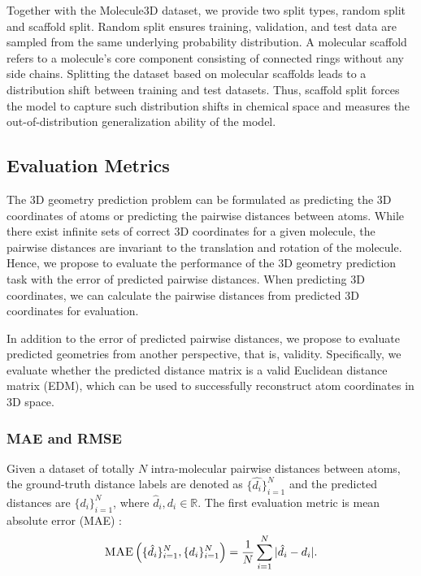 \documentclass{article}
\begin{document}
Together with the Molecule3D dataset, we provide two split types, random split and scaffold split. Random split ensures training, validation, and test data are sampled from the same underlying probability distribution. A molecular scaffold refers to a molecule's core component consisting of connected rings without any side chains. Splitting the dataset based on molecular scaffolds leads to a distribution shift between training and test datasets. Thus, scaffold split forces the model to capture such distribution shifts in chemical space and measures the out-of-distribution generalization ability of the model. 


\subsection{Evaluation Metrics}
The 3D geometry prediction problem can be formulated as predicting the 3D coordinates of atoms or predicting the pairwise distances between atoms. While there exist infinite sets of correct 3D coordinates for a given molecule, the pairwise distances are invariant to the translation and rotation of the molecule. Hence, we propose to evaluate the performance of the 3D geometry prediction task with the error of predicted pairwise distances. When predicting 3D coordinates, we can calculate the pairwise distances from predicted 3D coordinates for evaluation.

In addition to the error of predicted pairwise distances, we propose to evaluate predicted geometries from another perspective, that is, validity. Specifically, we evaluate whether the predicted distance matrix is a valid Euclidean distance matrix (EDM), which can be used to successfully reconstruct atom coordinates in 3D space. 

\subsubsection{MAE and RMSE}
Given a dataset of totally $N$ intra-molecular pairwise distances between atoms, the ground-truth distance labels are denoted as $\{\hat{d_i}\}_{i=1}^N$ and the predicted distances are $\{d_i\}_{i=1}^N$, where $\hat{d}_i, d_i \in \mathbb{R}$. The first evaluation metric is mean absolute error (\textsc{MAE}) \cite{willmott2005advantages}:
\begin{equation}\label{eqn:mae}
    \textsc{MAE}\left(\{\hat{d}_i\}_{i=1}^N,\{d_i\}_{i=1}^N\right)=\frac{1}{N}\sum_{i=1}^N |\hat{d}_i-d_i|.
\end{equation}
\end{document}
